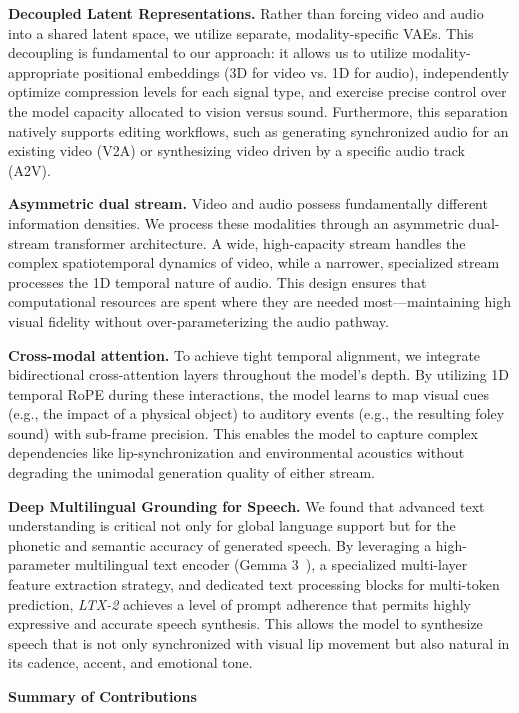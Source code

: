 \documentclass{article}
\begin{document}
\textbf{Decoupled Latent Representations.}
Rather than forcing video and audio into a shared latent space, we utilize separate, modality-specific VAEs. This decoupling is fundamental to our approach: it allows us to utilize modality-appropriate positional embeddings (3D for video vs. 1D for audio), independently optimize compression levels for each signal type, and exercise precise control over the model capacity allocated to vision versus sound. Furthermore, this separation natively supports editing workflows, such as generating synchronized audio for an existing video (V2A) or synthesizing video driven by a specific audio track (A2V).

\textbf{Asymmetric dual stream.}
Video and audio possess fundamentally different information densities. We process these modalities through an asymmetric dual-stream transformer architecture. A wide, high-capacity stream handles the complex spatiotemporal dynamics of video, while a narrower, specialized stream processes the 1D temporal nature of audio. This design ensures that computational resources are spent where they are needed most---maintaining high visual fidelity without over-parameterizing the audio pathway.

\textbf{Cross-modal attention.}
To achieve tight temporal alignment, we integrate bidirectional cross-attention layers throughout the model’s depth. By utilizing 1D temporal RoPE during these interactions, the model learns to map visual cues (e.g., the impact of a physical object) to auditory events (e.g., the resulting foley sound) with sub-frame precision. This enables the model to capture complex dependencies like lip-synchronization and environmental acoustics without degrading the unimodal generation quality of either stream.

\textbf{Deep Multilingual Grounding for Speech.}
We found that advanced text understanding is critical not only for global language support but for the phonetic and semantic accuracy of generated speech. By leveraging a high-parameter multilingual text encoder (Gemma 3~\cite{team2025gemma}), a specialized multi-layer feature extraction strategy, and dedicated text processing blocks for multi-token prediction, \textit{LTX-2} achieves a level of prompt adherence that permits highly expressive and accurate speech synthesis. This allows the model to synthesize speech that is not only synchronized with visual lip movement but also natural in its cadence, accent, and emotional tone.

\textbf{Summary of Contributions}
\end{document}
